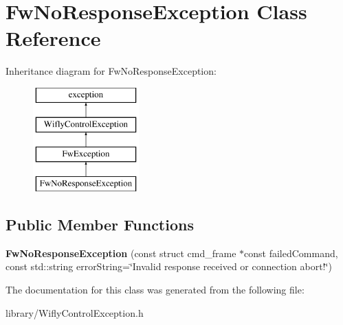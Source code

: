 \hypertarget{class_fw_no_response_exception}{\section{Fw\-No\-Response\-Exception Class Reference}
\label{class_fw_no_response_exception}
}
Inheritance diagram for Fw\-No\-Response\-Exception\-:\begin{figure}[H]
\begin{center}
\leavevmode
\includegraphics[height=4.000000cm]{class_fw_no_response_exception}
\end{center}
\end{figure}
\subsection*{Public Member Functions}
\begin{DoxyCompactItemize}
\item 
\hypertarget{class_fw_no_response_exception_ad34ddcad497c940499efcf7b138838c8}{{\bfseries Fw\-No\-Response\-Exception} (const struct cmd\-\_\-frame $\ast$const failed\-Command, const std\-::string error\-String=\char`\"{}Invalid response received or connection abort!\char`\"{})}\label{class_fw_no_response_exception_ad34ddcad497c940499efcf7b138838c8}

\end{DoxyCompactItemize}


The documentation for this class was generated from the following file\-:\begin{DoxyCompactItemize}
\item 
library/Wifly\-Control\-Exception.\-h\end{DoxyCompactItemize}
